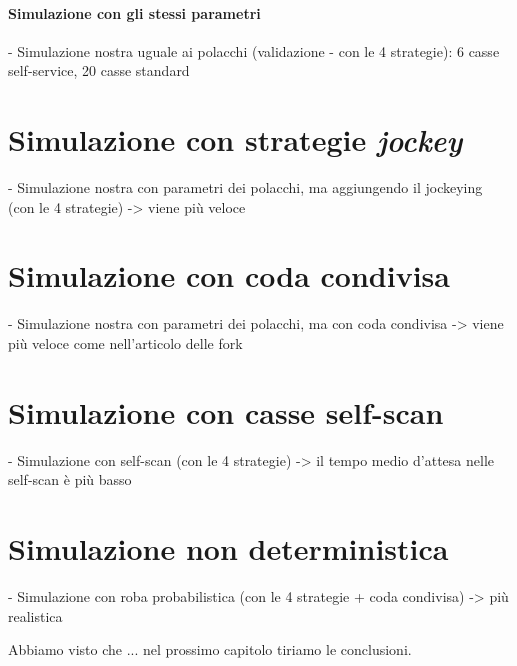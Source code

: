 \paragraph{Simulazione con gli stessi parametri}

- Simulazione nostra uguale ai polacchi (validazione - con le 4 strategie): 6 casse self-service, 20 casse standard

\section{Simulazione con strategie \textit{jockey}}
- Simulazione nostra con parametri dei polacchi, ma aggiungendo il jockeying (con le 4 strategie) -> viene più veloce

\section{Simulazione con coda condivisa}
- Simulazione nostra con parametri dei polacchi, ma con coda condivisa -> viene più veloce come nell'articolo delle fork

\section{Simulazione con casse self-scan}
- Simulazione con self-scan (con le 4 strategie) -> il tempo medio d'attesa nelle self-scan è più basso

\section{Simulazione non deterministica}
- Simulazione con roba probabilistica (con le 4 strategie + coda condivisa) -> più realistica

\vspace*{1\baselineskip}

Abbiamo visto che ... nel prossimo capitolo tiriamo le conclusioni.